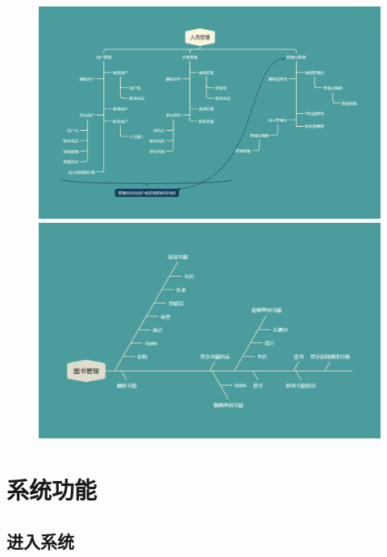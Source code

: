 \documentclass[12pt,twoside]{ctexart}
\begin{document}
\begin{figure}[H]
    \centering
    \begin{minipage}{0.49\textwidth}
        \centering
        \includegraphics[width=\linewidth]{part (1).png}
    \end{minipage}
    \hfill
    \begin{minipage}{0.49\textwidth}
        \centering
        \includegraphics[width=\linewidth]{part (2).png}
    \end{minipage}
\end{figure}

\section{系统功能}

\subsection{进入系统}
\end{document}
